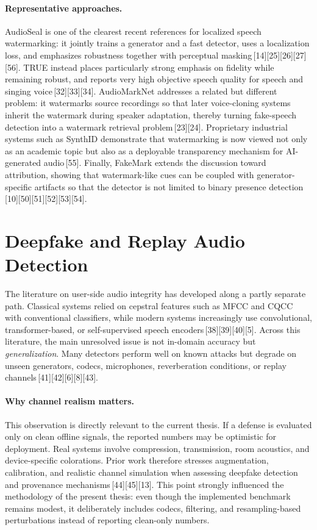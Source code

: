 \paragraph{Representative approaches.}
AudioSeal is one of the clearest recent references for localized speech watermarking: it jointly trains a generator and a fast detector, uses a localization loss, and emphasizes robustness together with perceptual masking\,[14][25][26][27][56]. TRUE instead places particularly strong emphasis on fidelity while remaining robust, and reports very high objective speech quality for speech and singing voice\,[32][33][34]. AudioMarkNet addresses a related but different problem: it watermarks source recordings so that later voice-cloning systems inherit the watermark during speaker adaptation, thereby turning fake-speech detection into a watermark retrieval problem\,[23][24]. Proprietary industrial systems such as SynthID demonstrate that watermarking is now viewed not only as an academic topic but also as a deployable transparency mechanism for AI-generated audio\,[55]. Finally, FakeMark extends the discussion toward attribution, showing that watermark-like cues can be coupled with generator-specific artifacts so that the detector is not limited to binary presence detection\,[10][50][51][52][53][54].

\section{Deepfake and Replay Audio Detection}
The literature on user-side audio integrity has developed along a partly separate path. Classical systems relied on cepstral features such as MFCC and CQCC with conventional classifiers, while modern systems increasingly use convolutional, transformer-based, or self-supervised speech encoders\,[38][39][40][5]. Across this literature, the main unresolved issue is not in-domain accuracy but \emph{generalization}. Many detectors perform well on known attacks but degrade on unseen generators, codecs, microphones, reverberation conditions, or replay channels\,[41][42][6][8][43].

\paragraph{Why channel realism matters.}
This observation is directly relevant to the current thesis. If a defense is evaluated only on clean offline signals, the reported numbers may be optimistic for deployment. Real systems involve compression, transmission, room acoustics, and device-specific colorations. Prior work therefore stresses augmentation, calibration, and realistic channel simulation when assessing deepfake detection and provenance mechanisms\,[44][45][13]. This point strongly influenced the methodology of the present thesis: even though the implemented benchmark remains modest, it deliberately includes codecs, filtering, and resampling-based perturbations instead of reporting clean-only numbers.

